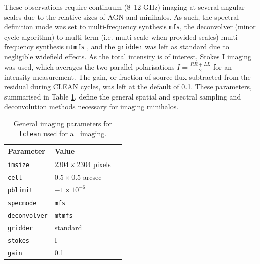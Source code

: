 These observations require continuum (8--12 GHz) imaging at several angular scales due to the relative sizes of AGN and minihalos. As such, the spectral definition mode was set to multi-frequency synthesis \texttt{mfs}, the deconvolver (minor cycle algorithm) to multi-term (i.e. multi-scale when provided scales) multi-frequency synthesis \texttt{mtmfs} \citep{Rau2011}, and the \texttt{gridder} was left as standard due to negligible widefield effects. As the total intensity is of interest, Stokes I imaging was used, which averages the two parallel polarisations $I = \frac{RR + LL}2$ for an intensity measurement. The gain, or fraction of source flux subtracted from the residual during CLEAN cycles, was left at the default of 0.1. These parameters, summarised in Table \ref{tab:image_params}, define the general spatial and spectral sampling and deconvolution methods necessary for imaging minihalos.

\begin{table}[ht]
    \centering
    \caption{General imaging parameters for \texttt{tclean} used for all imaging.}
    \label{tab:image_params}
    \begin{tabular}{lll}
        \hline
        \textbf{Parameter} & \textbf{Value} \\
        \hline
        \texttt{imsize} & $2304 \times 2304$ pixels\\
        \texttt{cell} & $0.5 \times 0.5$ arcsec \\
        \texttt{pblimit} & $-1 \times 10^{-6}$ \\
        \texttt{specmode} & \texttt{mfs} \\
        \texttt{deconvolver} & \texttt{mtmfs} \\
        \texttt{gridder} & standard \\
        \texttt{stokes} & I \\
        \texttt{gain} & 0.1\\
        \hline
    \end{tabular}
\end{table}

